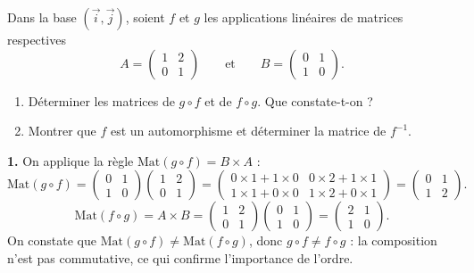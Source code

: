 \documentclass[11pt]{article}
\begin{document}
\begin{exoresolu}
Dans la base $(\vec{i},\vec{j})$, soient $f$ et $g$ les applications linéaires de matrices respectives
\[ A = \begin{pmatrix} 1 & 2 \\ 0 & 1 \end{pmatrix} \qquad \text{et} \qquad B = \begin{pmatrix} 0 & 1 \\ 1 & 0 \end{pmatrix}. \]
\begin{enumerate}
\item Déterminer les matrices de $g \circ f$ et de $f \circ g$. Que constate-t-on ?
\item Montrer que $f$ est un automorphisme et déterminer la matrice de $f^{-1}$.
\end{enumerate}
\tcblower
\textbf{1.} On applique la règle $\mathrm{Mat}(g \circ f) = B \times A$ :
\[ \mathrm{Mat}(g \circ f) = \begin{pmatrix} 0 & 1 \\ 1 & 0 \end{pmatrix} \begin{pmatrix} 1 & 2 \\ 0 & 1 \end{pmatrix} = \begin{pmatrix} 0\times 1 + 1\times 0 & 0\times 2 + 1\times 1 \\ 1\times 1 + 0\times 0 & 1\times 2 + 0\times 1 \end{pmatrix} = \begin{pmatrix} 0 & 1 \\ 1 & 2 \end{pmatrix}. \]
\[ \mathrm{Mat}(f \circ g) = A \times B = \begin{pmatrix} 1 & 2 \\ 0 & 1 \end{pmatrix} \begin{pmatrix} 0 & 1 \\ 1 & 0 \end{pmatrix} = \begin{pmatrix} 2 & 1 \\ 1 & 0 \end{pmatrix}. \]
On constate que $\mathrm{Mat}(g \circ f) \neq \mathrm{Mat}(f \circ g)$, donc $g \circ f \neq f \circ g$ : la composition n'est pas commutative, ce qui confirme l'importance de l'ordre.


\end{exoresolu}
\end{document}

